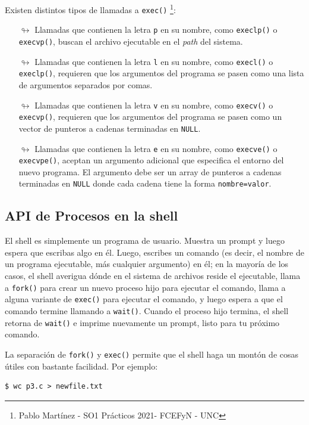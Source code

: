 \documentclass{article}
\begin{document}
Existen distintos tipos de llamadas a \texttt{exec()} \footnote{Pablo Martínez - SO1 Prácticos 2021- FCEFyN - UNC}:
\begin{itemize}
    \item[$\looparrowright$] Llamadas que contienen la letra \texttt{p} en su nombre, como \texttt{execlp()} o \texttt{execvp()}, buscan el archivo ejecutable en el \textit{path} del sistema.
    \item[$\looparrowright$] Llamadas que contienen la letra \texttt{l} en su nombre, como \texttt{execl()} o \texttt{execlp()}, requieren que los argumentos del programa se pasen como una lista de argumentos separados por comas.
    \item[$\looparrowright$] Llamadas que contienen la letra \texttt{v} en su nombre, como \texttt{execv()} o \texttt{execvp()}, requieren que los argumentos del programa se pasen como un vector de punteros a cadenas terminadas en \texttt{NULL}.
    \item[$\looparrowright$] Llamadas que contienen la letra \texttt{e} en su nombre, como \texttt{execve()} o \texttt{execvpe()}, aceptan un argumento adicional que especifica el entorno del nuevo programa. El argumento debe ser un array de punteros a cadenas terminadas en \texttt{NULL} donde cada cadena tiene la forma \texttt{nombre=valor}.
\end{itemize}

\subsection{API de Procesos en la shell}
El shell es simplemente un programa de usuario. Muestra un prompt y luego espera que escribas algo en él. Luego, escribes un comando (es decir, el nombre de un programa ejecutable, más cualquier argumento) en él; en la mayoría de los casos, el shell averigua dónde en el sistema de archivos reside el ejecutable, llama a \texttt{fork()} para crear un nuevo proceso hijo para ejecutar el comando, llama a alguna variante de \texttt{exec()} para ejecutar el comando, y luego espera a que el comando termine llamando a \texttt{wait()}. Cuando el proceso hijo termina, el shell retorna de \texttt{wait()} e imprime nuevamente un prompt, listo para tu próximo comando.

La separación de \texttt{fork()} y \texttt{exec()} permite que el shell haga un montón de cosas útiles con bastante facilidad. Por ejemplo:
\begin{verbatim}
$ wc p3.c > newfile.txt
\end{verbatim}
\end{document}
